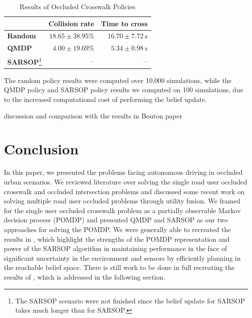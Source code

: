 \documentclass[conference]{IEEEtran}
\begin{document}
\begin{table}[tbhp]
    \caption{Results of Occluded Crosswalk Policies}
    \begin{center}
        \begin{tabular}{lrr}
            \hline \hline
             & \textbf{Collision rate} \hspace{3pt} & \textbf{Time to cross} \hspace{1pt} \\
            \hline
            \textbf{Random} & $18.65 \pm 38.95\%$ & $16.70 \pm 7.72 ~\si{\second}$ \\
            \textbf{QMDP}   & $4.00 \pm 19.69\%$  & $5.34 \pm 0.98 ~\si{\second}$ \\
            \textbf{SARSOP}\footnote{The SARSOP scenario were not finished since the belief update for SARSOP takes much longer than for SARSOP.} & -- & -- \\
            \hline \hline
        \end{tabular}
        \label{tab:results}
    \end{center}
\end{table}

The random policy results were computed over 10,000 simulations, while the QMDP policy and SARSOP policy results we computed on 100 simulations, due to the increased computational cost of performing the belief update.

discussion and comparison with the results in Bouton paper

\section{Conclusion}
\label{sec:conclusion}

In this paper, we presented the problems facing autonomous driving in occluded urban scenarios. We reviewed literature over solving the single road user occluded crosswalk and occluded intersection problems and discussed some recent work on solving multiple road user occluded problems through utility fusion. We framed for the single user occluded crosswalk problem as a partially observable Markov decision process (POMDP) and presented QMDP and SARSOP as our two approaches for solving the POMDP. We were generally able to recreated the results in \cite{Bouton2018ScalableDriving}, which highlight the strengths of the POMDP representation and power of the SARSOP algorithm in maintaining performance in the face of significant uncertainty in the environment and sensors by efficiently planning in the reachable belief space. There is still work to be done in full recreating the results of \cite{Bouton2018ScalableDriving}, which is addressed in the following section.
\end{document}
